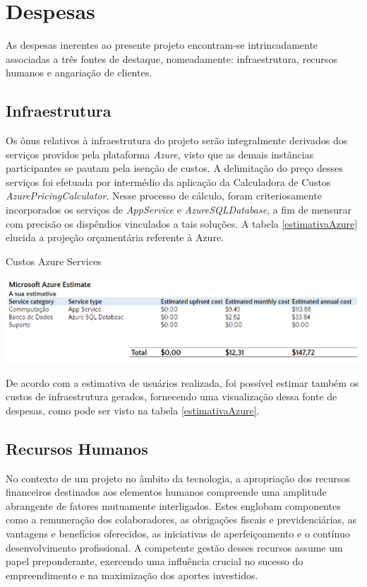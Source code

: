 \section{Despesas}

As despesas inerentes ao presente projeto encontram-se intrincadamente associadas a três fontes de destaque, nomeadamente: infraestrutura, recursos humanos e angariação de clientes.

\subsection{Infraestrutura}

Os ônus relativos à infraestrutura do projeto serão integralmente derivados dos serviços providos pela plataforma \textit{\gls{Azure}}, visto que as demais instâncias participantes se pautam pela isenção de custos. A delimitação do preço desses serviços foi efetuada por intermédio da aplicação da Calculadora de Custos \textit{\gls{AzurePricingCalculator}}. Nesse processo de cálculo, foram criteriosamente incorporados os serviços de \textit{\gls{AppService}} e \textit{\gls{AzureSQLDatabase}}, a fim de mensurar com precisão os dispêndios vinculados a tais soluções. A tabela \ref{estimativaAzure} elucida a projeção orçamentária referente à Azure.

\begin{table}[H]
    \setcounter{table}{0}
    \center
	\caption{Custos Azure Services}
    \includegraphics[scale=0.55]{imagens/viabilidadeFinanceira/estimativaAzure.png}
    \label{estimativaAzure}
\end{table}

De acordo com a estimativa de usuários realizada, foi possível estimar também os custos de infraestrutura gerados, fornecendo uma visualização dessa fonte de despesas, como pode ser visto na tabela \ref{estimativaAzure}.

\subsection{Recursos Humanos}

No contexto de um projeto no âmbito da tecnologia, a apropriação dos recursos financeiros destinados aos elementos humanos compreende uma amplitude abrangente de fatores mutuamente interligados. Estes englobam componentes como a remuneração dos colaboradores, as obrigações fiscais e previdenciárias, as vantagens e benefícios oferecidos, as iniciativas de aperfeiçoamento e o contínuo desenvolvimento profissional. A competente gestão desses recursos assume um papel preponderante, exercendo uma influência crucial no sucesso do empreendimento e na maximização dos aportes investidos.

